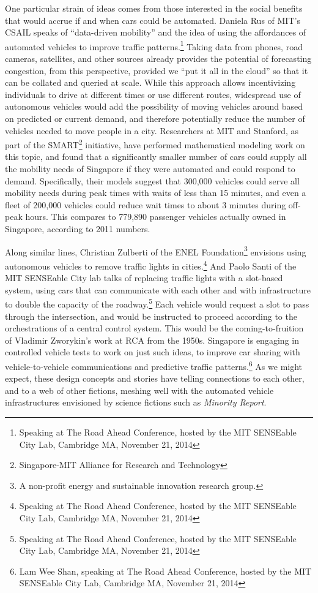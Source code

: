 One particular strain of ideas comes from those interested in the
social benefits that would accrue if and when cars could be automated.
Daniela Rus of MIT's CSAIL speaks of ``data-driven mobility'' and the
idea of using the affordances of automated vehicles to improve traffic
patterns.\footnote{Speaking at The Road Ahead Conference, hosted by
  the MIT SENSEable City Lab, Cambridge MA, November 21, 2014} Taking
data from phones, road cameras, satellites, and other 
sources already provides the potential of forecasting congestion, from
this perspective,
provided we ``put it all in the cloud'' so that it can be collated and
queried at scale. While this approach allows incentivizing individuals to drive at
different times or use different routes, widespread use of autonomous vehicles would add
the possibility of moving vehicles around based on predicted or
current demand, and therefore potentially reduce the number of
vehicles needed to move people in a city. Researchers at MIT and Stanford, as part of the
SMART\footnote{Singapore-MIT Alliance for Research and Technology} initiative, have
performed mathematical modeling work on this topic, and found that a
significantly smaller number of cars could supply all the mobility
needs of Singapore if they were automated and could respond to demand.
Specifically, their models suggest that 300,000 vehicles could serve
all mobility needs during peak times with waits of less than 15
minutes, and even a fleet of 200,000 vehicles could reduce wait times
to about 3 minutes during off-peak hours.\cite{frazzoliSingapore} This
compares to 779,890 passenger vehicles actually owned in Singapore,
according to 2011 numbers.

Along similar
lines, Christian Zulberti of the ENEL Foundation\footnote{A non-profit
  energy and sustainable innovation research group.} envisions using
autonomous vehicles to remove traffic lights in
cities.\footnote{Speaking at The Road Ahead Conference, hosted by
  the MIT SENSEable City Lab, Cambridge MA, November 21, 2014} And Paolo
Santi of the MIT SENSEable City lab talks of replacing traffic lights
with a slot-based system, using cars that can communicate with each
other and with infrastructure to double the capacity of the
roadway.\footnote{Speaking at The Road Ahead Conference, hosted by
  the MIT SENSEable City Lab, Cambridge MA, November 21, 2014} Each vehicle would request a slot to pass through the
intersection, and would be instructed to proceed according to the
orchestrations of a central control system. This would be the coming-to-fruition of
Vladimir Zworykin's work at RCA from the 1950s. Singapore is engaging in
controlled vehicle tests to work on just such ideas, to improve car
sharing with vehicle-to-vehicle communications and predictive traffic
patterns.\footnote{Lam Wee Shan, speaking at The Road Ahead Conference, hosted by
  the MIT SENSEable City Lab, Cambridge MA, November 21, 2014} As we
might expect, these
design concepts and stories have telling connections to each other, and
to a web of other fictions, meshing well with the automated vehicle
infrastructures envisioned by science fictions such as \emph{Minority Report}.

